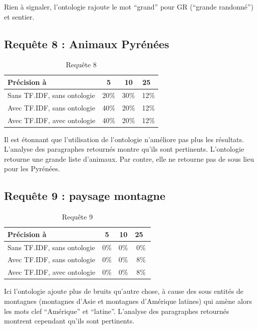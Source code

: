 \documentclass{article}
\begin{document}
Rien à signaler, l’ontologie rajoute le mot “grand” pour GR (“grande randonné”) et
sentier.

\subsection{Requête 8 : \og Animaux Pyrénées \fg }

\begin{table}[h!!]
    \centering
    \caption{Requête 8}
\begin{tabular}{|l|c|c|c|}
    \hline
    Précision à & 5 & 10 & 25 \\
    \hline
    Sans TF.IDF, sans ontologie & 20\% & 30\% &  12\% \\
    \hline
    Avec TF.IDF, sans ontologie & 40\% & 20\% &  12\% \\
    \hline
    Avec TF.IDF, avec ontologie & 40\% & 20\% &  12\% \\
    \hline
\end{tabular}
\end{table}

Il est étonnant que l’utilisation de l’ontologie n’améliore pas plus les résultats.
L’analyse des paragraphes retournés montre qu’ils sont pertinents. L’ontologie
retourne une grande liste d’animaux. Par contre, elle ne retourne pas de sous lieu
pour les Pyrénées.

\subsection{Requête 9 : \og paysage montagne \fg }

\begin{table}[h!!]
    \centering
    \caption{Requête 9}
\begin{tabular}{|l|c|c|c|}
    \hline
    Précision à & 5 & 10 & 25 \\
    \hline
    Sans TF.IDF, sans ontologie & 0\% & 0\% & 0\% \\
    \hline
    Avec TF.IDF, sans ontologie & 0\% & 0\% & 8\% \\
    \hline
    Avec TF.IDF, avec ontologie & 0\% & 0\% & 8\% \\
    \hline
\end{tabular}
\end{table}

Ici l’ontologie ajoute plus de bruits qu’autre chose, à cause des sous entités de
montagnes (montagnes d’Asie et montagnes d’Amérique latines) qui amène alors les mots
clef “Amérique” et “latine”. L’analyse des paragraphes retournés montrent cependant
qu’ils sont pertinents.
\end{document}
